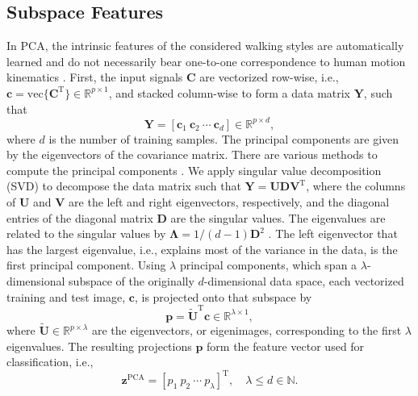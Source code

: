 \subsection{Subspace Features}\label{subsec:pcafeatures}
In PCA, the intrinsic features of the considered walking styles are automatically learned and do not necessarily bear one-to-one correspondence to human motion kinematics \cite{Sei17a}. First, the input signals $\mathbf{C}$ are vectorized row-wise, i.e., $\mathbf{c} = \text{vec}\{\mathbf{C}^\mathrm{T}\} \in \mathbb{R}^{p \times 1}$, and stacked column-wise to form a data matrix $\mathbf{Y}$, such that
\begin{equation}
\mathbf{Y} = [\mathbf{c}_1~\mathbf{c}_2~\cdots~\mathbf{c}_d ] \in \mathbb{R}^{p \times d},
\end{equation} 
where $d$ is the number of training samples. The principal components are given by the eigenvectors of the covariance matrix.
There are various methods to compute the principal components \cite{Shl14}. We apply singular value decomposition (SVD) to decompose the data matrix such that $\mathbf{Y} = \mathbf{U} \mathbf{D} \mathbf{V}^\mathrm{T}$, where the columns of $\mathbf{U}$ and $\mathbf{V}$ are the left and right eigenvectors, respectively, and the diagonal entries of the diagonal matrix $\mathbf{D}$ are the singular values. The eigenvalues are related to the singular values by $\mathbf{\Lambda} = 1/(d-1) \mathbf{D}^2$ \cite{Koc13}.
The left eigenvector that has the largest eigenvalue, i.e., explains most of the variance in the data, is the first principal component. Using $\lambda$ principal components, which span a $\lambda$-dimensional subspace of the originally $d$-dimensional data space, each vectorized training and test image, $\mathbf{c}$, is projected onto that subspace by
\begin{equation}
\mathbf{p} = \tilde{\mathbf{U}}^\mathrm{T} \mathbf{c} \in \mathbb{R}^{\lambda \times 1},
\end{equation}
where $\tilde{\mathbf{U}} \in \mathbb{R}^{p \times \lambda}$ are the eigenvectors, or eigenimages, corresponding to the first $\lambda$ eigenvalues. The resulting projections $\mathbf{p}$ form the feature vector used for classification, i.e.,
\begin{equation}
\mathbf{z}^\text{PCA} = [p_1~p_2~\cdots~p_{\lambda}]^\mathrm{T}, \quad \lambda \leq d \in \mathbb{N}.
\label{eq:pcafeature}
\end{equation}

